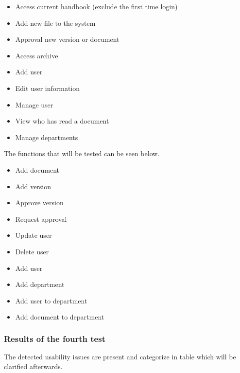 \begin{itemize}
	\item Access current handbook (exclude the first time login)
	\item Add new file to the system
	\item Approval new version or document
	\item Access archive 
	\item Add user 
	\item Edit user information
	\item Manage user 
	\item View who has read a document 
	\item Manage departments
\end{itemize}

The functions that will be tested can be seen below.

\begin{itemize}
	\item Add document
	\item Add version
	\item Approve version
	\item Request approval
	\item Update user
	\item Delete user
	\item Add user
	\item Add department
	\item Add user to department
	\item Add document to department
\end{itemize}

\subsubsection*{Results of the fourth test}
The detected usability issues are present and categorize in table 
 which will be clarified afterwards. 

